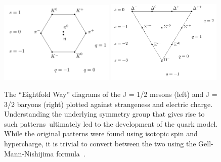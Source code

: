 \begin{figure}[t!]
    \centering
    \includegraphics[width=0.49\textwidth]{figures/introduction/Meson_octet.png}
    \includegraphics[width=0.49\textwidth]{figures/introduction/Baryon_decuplet.png}
    \caption{The ``Eightfold Way'' diagrams of the J = 1/2 mesons (left) and J = 3/2 baryons (right) plotted against strangeness and electric charge. Understanding the underlying symmetry group that gives rise to such patterns\protect\footnotemark \  ultimately led to the development of the quark model. While the original patterns were found using isotopic spin and hypercharge, it is trivial to convert between the two using the Gell-Mann-Nishijima formula~\cite{GellMannNishijima_1, GellMannNishijima_2}.}
    \label{fig:eightfold_way}
\end{figure}
%

